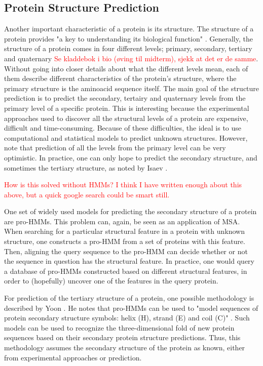 \documentclass{article}\usepackage[]{graphicx}\usepackage[]{color}
\begin{document}
\subsection{Protein Structure Prediction}\label{Section:ProtStructurePred}
Another important characteristic of a protein is its structure. The structure of a protein provides "a key to understanding its biological function" \cite{Isaev2006}. Generally, the structure of a protein comes in four different levels; primary, secondary, tertiary and quaternary \textcolor{red}{Se kladdebok i bio (øving til midterm), sjekk at det er de samme}. Without going into closer details about what the different levels mean, each of them describe different characteristics of the protein's structure, where the primary structure is the aminoacid sequence itself. The main goal of the structure prediction is to predict the secondary, tertairy and quaternary levels from the primary level of a specific protein. This is interesting because the experimental approaches used to discover all the structural levels of a protein are expensive, difficult and time-consuming. Because of these difficulties, the ideal is to use computational and statistical models to predict unknown structures. However, note that prediction of all the levels from the primary level can be very optimistic. In practice, one can only hope to predict the secondary structure, and sometimes the tertiary structure, as noted by Isaev \cite{Isaev2006}.

\textcolor{red}{How is this solved without HMMs? I think I have written enough about this above, but a quick google search could be smart still.}

One set of widely used models for predicting the secondary structure of a protein are pro-HMMs. This problem can, again, be seen as an application of MSA. When searching for a particular structural feature in a protein with unknown structure, one constructs a pro-HMM from a set of proteins with this feature. Then, aligning the query sequence to the pro-HMM can decide whether or not the sequence in question has the structural feature. In practice, one would query a database of pro-HMMs constructed based on different structural features, in order to (hopefully) uncover one of the features in the query protein.  

For prediction of the tertiary structure of a protein, one possible methodology is described by Yoon \cite{Yoon2009}. He notes that pro-HMMs can be used to "model sequences of protein secondary structure symbols: helix (H), strand (E) and coil (C)" \cite{Yoon2009}. Such models can be used to recognize the three-dimensional fold of new protein sequences based on their secondary protein structure predictions. Thus, this methodology assumes the secondary structure of the protein as known, either from experimental approaches or prediction. 
\end{document}
